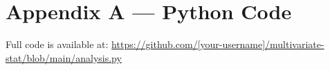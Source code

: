 \documentclass[11pt, a4paper]{article}
\begin{document}
\newpage
\appendix
\section*{Appendix A — Python Code}

Full code is available at:
\url{https://github.com/[your-username]/multivariate-stat/blob/main/analysis.py}

% 
\end{document}
